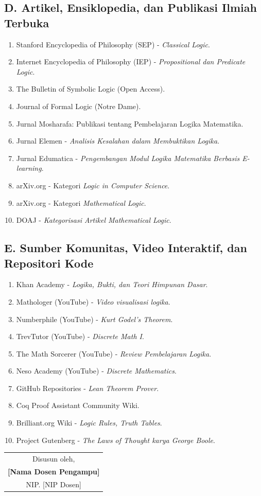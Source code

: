 \documentclass[12pt,a4paper]{article}
\begin{document}
\subsection*{D. Artikel, Ensiklopedia, dan Publikasi Ilmiah Terbuka}
\begin{enumerate}[leftmargin=*, label={D\arabic*.}]
  \item Stanford Encyclopedia of Philosophy (SEP) - \textit{Classical Logic}.
  \item Internet Encyclopedia of Philosophy (IEP) - \textit{Propositional dan Predicate Logic}.
  \item The Bulletin of Symbolic Logic (Open Access).
  \item Journal of Formal Logic (Notre Dame).
  \item Jurnal Mosharafa: Publikasi tentang Pembelajaran Logika Matematika.
  \item Jurnal Elemen - \textit{Analisis Kesalahan dalam Membuktikan Logika}.
  \item Jurnal Edumatica - \textit{Pengembangan Modul Logika Matematika Berbasis E-learning}.
  \item arXiv.org - Kategori \textit{Logic in Computer Science}.
  \item arXiv.org - Kategori \textit{Mathematical Logic}.
  \item DOAJ - \textit{Kategorisasi Artikel Mathematical Logic}.
\end{enumerate}

\subsection*{E. Sumber Komunitas, Video Interaktif, dan Repositori Kode}
\begin{enumerate}[leftmargin=*, label={E\arabic*.}]
  \item Khan Academy - \textit{Logika, Bukti, dan Teori Himpunan Dasar}.
  \item Mathologer (YouTube) - \textit{Video visualisasi logika}.
  \item Numberphile (YouTube) - \textit{Kurt Godel's Theorem}.
  \item TrevTutor (YouTube) - \textit{Discrete Math I}.
  \item The Math Sorcerer (YouTube) - \textit{Review Pembelajaran Logika}.
  \item Neso Academy (YouTube) - \textit{Discrete Mathematics}.
  \item GitHub Repositories - \textit{Lean Theorem Prover}.
  \item Coq Proof Assistant Community Wiki.
  \item Brilliant.org Wiki - \textit{Logic Rules, Truth Tables}.
  \item Project Gutenberg - \textit{The Laws of Thought karya George Boole}.
\end{enumerate}

\vspace{1cm}

\begin{flushright}
\begin{tabular}{c}
Disusun oleh,\\[2cm]
\textbf{[Nama Dosen Pengampu]}\\
NIP. [NIP Dosen]
\end{tabular}
\end{flushright}
\end{document}
